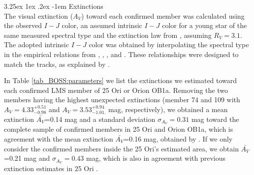 \documentclass[12pt]{article}
\makeatletter
\renewcommand\paragraph{\@startsection{paragraph}{5}{\z@}%
  {3.25ex \@plus1ex \@minus.2ex}%
  {-1em}%
  {\normalfont\normalsize\bfseries}}
\makeatother
\begin{document}
\paragraph{Extinctions\\}
\label{sec_BOSS:extinction}
The visual extinction ($A_V$) toward each confirmed member was calculated using the observed $I-J$ color, an assumed intrinsic $I-J$ color for a young star of the same measured spectral type and the extinction law from \citet{Fitzpatrick1999}, assuming $R_V=3.1$. The adopted intrinsic $I-J$ color was obtained by interpolating the spectral type in the empirical relations from \citet{Kenyon-Hartmann1995}, \citet{Luhman1999}, \citet{Briceno2002}, and \citet{Luhman2003a}. These relationships were designed to match the \citet{Baraffe1998} tracks, as explained by \citet{Luhman2003b}.

In Table \ref{tab_BOSS:parameters} we list the extinctions we estimated toward each confirmed LMS member of 25 Ori or Orion OB1a. Removing the two members having the highest unexpected extinctions (member 74 and 109 with $A_V=4.33^{+0.51}_{-0.98}$ and $A_V=3.53^{+0.94}_{-1.01.}$ mag, respectively), we obtained a mean extinction $\bar{A_V}$=0.14 mag and a standard deviation $\sigma _{A_V}=0.31$ mag toward the complete sample of confirmed members in 25 Ori and Orion OB1a, which is agreement with the mean extinction $\bar{A_V}$=0.16 mag, obtained by \citet{Downes2015}. If we only consider the confirmed members inside the 25 Ori's estimated area, we obtain $\bar{A_V}$=0.21 mag and $\sigma _{A_V}=0.43$ mag, which is also in agreement with previous extinction estimates in 25 Ori \citep[0.27 mag, 0.28 mag, 0.29 mag, and 0.30 mag by ][respectively]{Kharchenko2005, Briceno2005, Briceno2007, Downes2014}.
\end{document}
